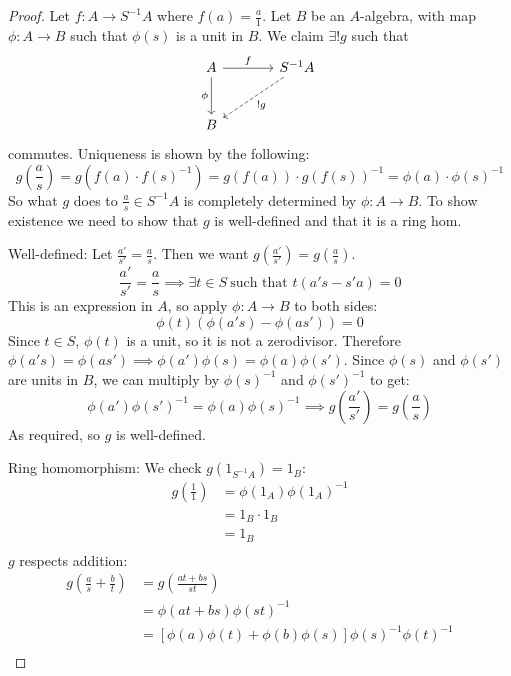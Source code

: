 \documentclass[hidelinks,12pt]{article}
\begin{document}
\begin{proof}
    Let \(f:A\to S^{-1}A\) where \(f(a)=\frac{a}{1}\). Let \(B\) be an \(A\)-algebra, with map \(\phi:A\to B\) such that \(\phi(s)\) is a unit in \(B\). We claim \(\exists!g\) such that 
    \[
        \begin{tikzcd}[row sep=large,column sep=large]
            A \arrow[r, "f"] \arrow[d, "\phi"'] & S^{-1}A \arrow[dl, "!g",dashed] \\
            B &
        \end{tikzcd}
    \]
    commutes. Uniqueness is shown by the following: \[
        g\left(\frac{a}{s}\right)=g(f(a)\cdot f(s)^{-1})=g(f(a))\cdot g(f(s))^{-1}=\phi(a)\cdot\phi(s)^{-1}
    \]
    So what \(g\) does to \(\frac{a}{s}\in S^{-1}A\) is completely determined by \(\phi:A\to B\). To show existence we need to show that \(g\) is well-defined and that it is a ring hom.
    \par
    Well-defined: Let \(\frac{a'}{s'}=\frac{a}{s}\). Then we want \(g\left(\frac{a'}{s'}\right)=g\left(\frac{a}{s}\right)\). \[
        \frac{a'}{s'}=\frac{a}{s}\implies\exists t\in S\ \text{such that } t(a's-s'a)=0
    \]
    This is an expression in \(A\), so apply \(\phi:A\to B\) to both sides:
    \[
        \phi(t)(\phi(a's)-\phi(as'))=0
    \]
    Since \(t\in S\), \(\phi(t)\) is a unit, so it is not a zerodivisor. Therefore \(\phi(a's)=\phi(as')\implies \phi(a')\phi(s)=\phi(a)\phi(s')\). Since \(\phi(s)\) and \(\phi(s')\) are units in \(B\), we can multiply by \(\phi(s)^{-1}\) and \(\phi(s')^{-1}\) to get: \[
        \phi(a')\phi(s')^{-1}=\phi(a)\phi(s)^{-1}\implies g\left(\frac{a'}{s'}\right)=g\left(\frac{a}{s}\right)
    \]
    As required, so \(g\) is well-defined.
    \par Ring homomorphism: We check \(g(1_{S^{-1}A})=1_{B}\): \begin{align*}
        g\left(\frac{1}{1}\right)&=\phi(1_{A})\phi(1_{A})^{-1}\\
                                 &=1_{B}\cdot 1_{B}\\
                                 &=1_{B}\\
    \end{align*}
    \(g\) respects addition:
    \begin{align*}
        g\left(\frac{a}{s}+\frac{b}{t}\right)&=g\left(\frac{at+bs}{st}\right)\\
                                             &=\phi(at+bs)\phi(st)^{-1}\\
                                             &=\left[ \phi(a)\phi(t)+\phi(b)\phi(s) \right]\phi(s)^{-1}\phi(t)^{-1}\\

\end{align*}
\end{proof}
\end{document}
